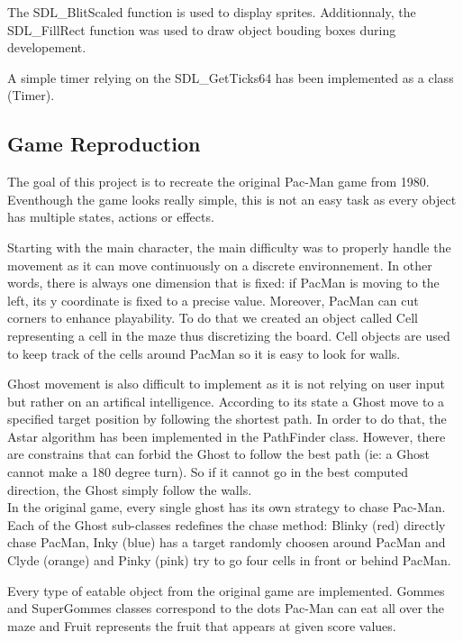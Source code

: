 The \textsf{SDL\_BlitScaled} function is used to display sprites. Additionnaly, the \textsf{SDL\_FillRect} function was used to draw object bouding boxes during developement.

A simple timer relying on the \textsf{SDL\_GetTicks64} has been implemented as a class (\textsf{Timer}).

\subsection{Game Reproduction}
The goal of this project is to recreate the original Pac-Man game from 1980. Eventhough the game looks really simple, this is not an easy task as every object has multiple states, actions or effects.

Starting with the main character, the main difficulty was to properly handle the movement as it can move continuously on a discrete environnement. In other words, there is always one dimension that is fixed: if \textsf{PacMan} is moving to the left, its y coordinate is fixed to a precise value. Moreover, \textsf{PacMan} can cut corners to enhance playability. To do that we created an object called \textsf{Cell} representing a cell in the maze thus discretizing the board. \textsf{Cell} objects are used to keep track of the cells around \textsf{PacMan} so it is easy to look for walls.

\textsf{Ghost} movement is also difficult to implement as it is not relying on user input but rather on an artifical intelligence. According to its state a \textsf{Ghost} move to a specified target position by following the shortest path. In order to do that, the Astar algorithm has been implemented in the \textsf{PathFinder} class. However, there are constrains that can forbid the \textsf{Ghost} to follow the best path (ie: a \textsf{Ghost} cannot make a 180 degree turn). So if it cannot go in the best computed direction, the \textsf{Ghost} simply follow the walls.\\
In the original game, every single ghost has its own strategy to chase Pac-Man. Each of the \textsf{Ghost} sub-classes redefines the \textsf{chase} method: \textsf{Blinky} (red) directly chase \textsf{PacMan}, \textsf{Inky} (blue) has a target randomly choosen around \textsf{PacMan} and \textsf{Clyde} (orange) and \textsf{Pinky} (pink) try to go four cells in front or behind \textsf{PacMan}.

Every type of eatable object from the original game are implemented. \textsf{Gommes} and \textsf{SuperGommes} classes correspond to the dots Pac-Man can eat all over the maze and \textsf{Fruit} represents the fruit that appears at given score values.

